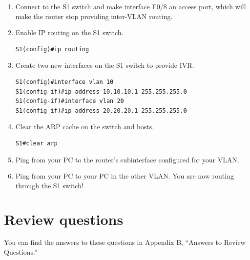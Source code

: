 \documentclass[b5paper,11pt]{memoir}
\begin{document}
\begin{enumerate}
\item
  Connect to the S1 switch and make interface F0/8 an access port, which
  will make the router stop providing inter-VLAN routing.
\item
  Enable IP routing on the S1 switch.

\begin{verbatim}
S1(config)#ip routing
\end{verbatim}
\item
  Create two new interfaces on the S1 switch to provide IVR.

\begin{verbatim}
S1(config)#interface vlan 10
S1(config-if)#ip address 10.10.10.1 255.255.255.0
S1(config-if)#interface vlan 20
S1(config-if)#ip address 20.20.20.1 255.255.255.0
\end{verbatim}
\item
  Clear the ARP cache on the switch and hosts.

\begin{verbatim}
S1#clear arp
\end{verbatim}
\item
  Ping from your PC to the router's subinterface configured for your
  VLAN.
\item
  Ping from your PC to your PC in the other VLAN. You are now routing
  through the S1 switch!
\end{enumerate}




\section{Review questions}

You can find the answers to these questions in Appendix B, ``Answers to Review Questions.''
\end{document}
